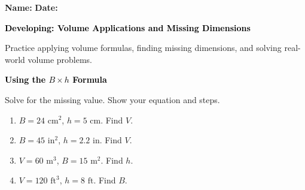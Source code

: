\documentclass[12pt, letterpaper, fleqn]{article}
\begin{document}
\textbf{Name:} \underline{\hspace{5cm}}
\hfill
\textbf{Date:} \underline{\hspace{3cm}}\\

\begin{tcolorbox}[colback=black!10]
    \large\textcolor{black}{\textbf{Developing: Volume Applications and Missing Dimensions}}
\end{tcolorbox}

\vspace{3mm}

\noindent
Practice applying volume formulas, finding missing dimensions, and solving real-world volume problems.

\vspace{4mm}

\begin{tcolorbox}[colback=black!10]
\large\textcolor{black}{\textbf{Using the $B \times h$ Formula}}
\end{tcolorbox}

\noindent
Solve for the missing value. Show your equation and steps.

\vspace{3mm}

\begin{enumerate}[itemsep=2.2cm, leftmargin=0.6cm]

\item $B = 24\text{ cm}^2$, $h = 5\text{ cm}$. Find $V$.

\vspace{1.8cm}

\item $B = 45\text{ in}^2$, $h = 2.2\text{ in}$. Find $V$.

\vspace{1.8cm}

\item $V = 60\text{ m}^3$, $B = 15\text{ m}^2$. Find $h$.

\vspace{1.8cm}

\item $V = 120\text{ ft}^3$, $h = 8\text{ ft}$. Find $B$.

\vspace{1.8cm}

\end{enumerate}
\end{document}
